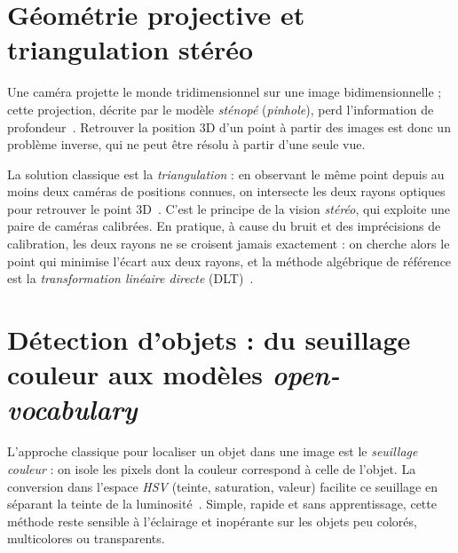 
\section{Géométrie projective et triangulation stéréo}

Une caméra projette le monde tridimensionnel sur une image bidimensionnelle ; cette projection, décrite par le modèle \emph{sténopé} (\emph{pinhole}), perd l'information de profondeur~\cite{hartley_multiple_2018,forsyth_computer_2012}. Retrouver la position 3D d'un point à partir des images est donc un problème inverse, qui ne peut être résolu à partir d'une seule vue.

La solution classique est la \emph{triangulation} : en observant le même point depuis au moins deux caméras de positions connues, on intersecte les deux rayons optiques pour retrouver le point 3D~\cite{hartley_multiple_2018}. C'est le principe de la vision \emph{stéréo}, qui exploite une paire de caméras calibrées. En pratique, à cause du bruit et des imprécisions de calibration, les deux rayons ne se croisent jamais exactement : on cherche alors le point qui minimise l'écart aux deux rayons, et la méthode algébrique de référence est la \emph{transformation linéaire directe} (DLT)~\cite{hartley_multiple_2018}.


\section{Détection d'objets : du seuillage couleur aux modèles \textit{open-vocabulary}}

L'approche classique pour localiser un objet dans une image est le \emph{seuillage couleur} : on isole les pixels dont la couleur correspond à celle de l'objet. La conversion dans l'espace \emph{HSV} (teinte, saturation, valeur) facilite ce seuillage en séparant la teinte de la luminosité~\cite{forsyth_computer_2012}. Simple, rapide et sans apprentissage, cette méthode reste sensible à l'éclairage et inopérante sur les objets peu colorés, multicolores ou transparents.

